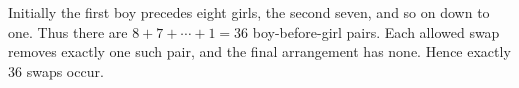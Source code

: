 Initially the first boy precedes eight girls, the second seven, and so on down to one. Thus there are $8+7+\cdots+1=36$ boy-before-girl pairs. Each allowed swap removes exactly one such pair, and the final arrangement has none. Hence exactly $\boxed{36}$ swaps occur.
